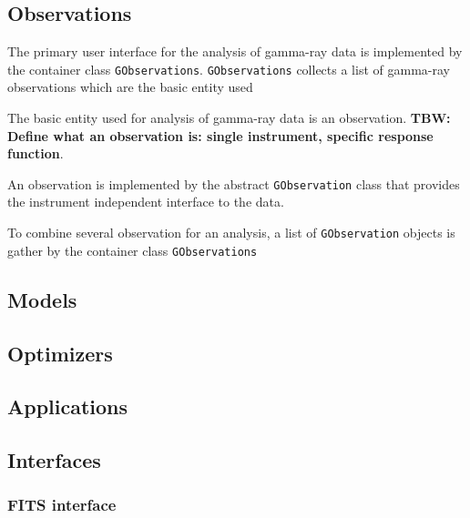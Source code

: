\documentclass{article}[12pt,a4]
\begin{document}
\subsection{Observations}

The primary user interface for the analysis of gamma-ray data is implemented by
the container class {\tt GObservations}.
{\tt GObservations} collects a list of gamma-ray observations which are the basic
entity used

The basic entity used for analysis of gamma-ray data is an observation.
{\bf TBW: Define what an observation is: single instrument, specific response function}.

An observation is implemented by the abstract {\tt GObservation} class that provides
the instrument independent interface to the data.

To combine several observation for an analysis, a list of {\tt GObservation} objects is
gather by the container class {\tt GObservations}


\subsection{Models}



\subsection{Optimizers}



\subsection{Applications}


\subsection{Interfaces}

\subsubsection{FITS interface}

\end{document}
